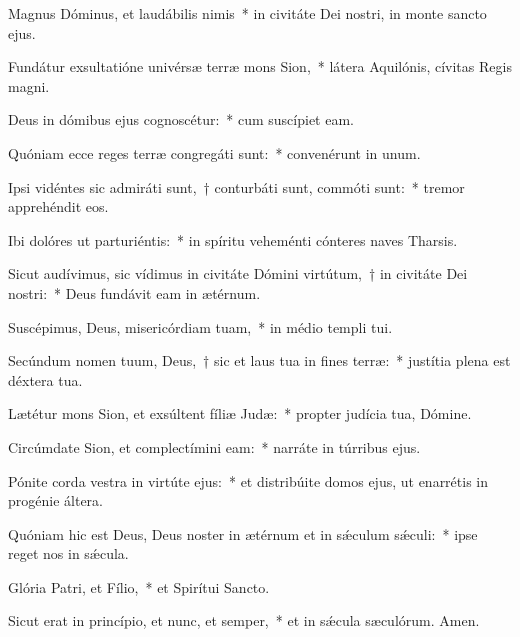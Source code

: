 \item Magnus Dóminus, et laudábilis nimis~* in civitáte Dei nostri, in monte sancto ejus.

\item Fundátur exsultatióne univérsæ terræ mons Sion,~* látera Aquilónis, cívitas Regis magni.

\item Deus in dómibus ejus cognoscétur:~* cum suscípiet eam.

\item Quóniam ecce reges terræ congregáti sunt:~* convenérunt in unum.

\item Ipsi vidéntes sic admiráti sunt,~† conturbáti sunt, commóti sunt:~* tremor apprehéndit eos.

\item Ibi dolóres ut parturiéntis:~* in spíritu veheménti cónteres naves Tharsis.

\item Sicut audívimus, sic vídimus in civitáte Dómini virtútum,~† in civitáte Dei nostri:~* Deus fundávit eam in ætérnum.

\item Suscépimus, Deus, misericórdiam tuam,~* in médio templi tui.

\item Secúndum nomen tuum, Deus,~† sic et laus tua in fines terræ:~* justítia plena est déxtera tua.

\item Lætétur mons Sion, et exsúltent fíliæ Judæ:~* propter judícia tua, Dómine.

\item Circúmdate Sion, et complectímini eam:~* narráte in túrribus ejus.

\item Pónite corda vestra in virtúte ejus:~* et distribúite domos ejus, ut enarrétis in progénie áltera.

\item Quóniam hic est Deus, Deus noster in ætérnum et in sǽculum sǽculi:~* ipse reget nos in sǽcula.

\item Glória Patri, et Fílio,~* et Spirítui Sancto.

\item Sicut erat in princípio, et nunc, et semper,~* et in sǽcula sæculórum. Amen.

